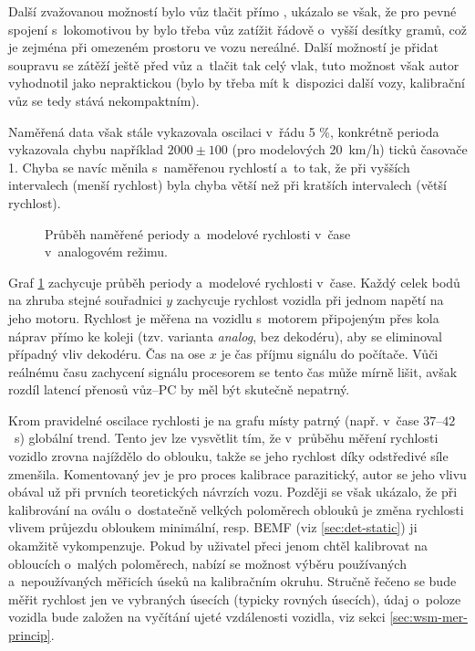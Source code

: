 Další zvažovanou možností bylo vůz tlačit přímo ,
ukázalo se však, že pro pevné spojení s~lokomotivou by bylo třeba vůz zatížit
řádově o~vyšší desítky gramů, což je zejména při omezeném prostoru ve vozu
nereálné. Další možností je přidat soupravu se zátěží ještě před vůz a~tlačit
tak celý vlak, tuto možnost však autor vyhodnotil jako nepraktickou (bylo by
třeba mít k~dispozici další vozy, kalibrační vůz se tedy stává nekompaktním).

Naměřená data však stále vykazovala oscilaci v~řádu 5 \%, konkrétně perioda
vykazovala chybu například $2000 \pm 100$ (pro modelových 20~km/h) ticků
časovače 1. Chyba se navíc měnila s~naměřenou rychlostí a~to tak, že při
vyšších intervalech (menší rychlost) byla chyba větší než při kratších
intervalech (větší rychlost).

\begin{figure}[ht]

\caption{Průběh naměřené periody a~modelové rychlosti v~čase v~analogovém
režimu.}
\label{fig:speed-analog}
\end{figure}

Graf \ref{fig:speed-analog} zachycuje průběh periody a~modelové rychlosti
v~čase. Každý celek bodů na zhruba stejné souřadnici $y$ zachycuje rychlost
vozidla při jednom napětí na jeho motoru. Rychlost je měřena na vozidlu
s~motorem připojeným přes kola náprav přímo ke koleji (tzv. varianta
\textit{analog}, bez dekodéru), aby se eliminoval případný vliv dekodéru. Čas
na ose $x$ je čas příjmu signálu do počítače. Vůči reálnému času zachycení
signálu procesorem se tento čas může mírně lišit, avšak rozdíl latencí
přenosů vůz--PC by měl být skutečně nepatrný.

Krom pravidelné oscilace rychlosti je na grafu místy patrný (např. v~čase
$37$--$42$~s) globální  trend. Tento jev lze vysvětlit tím, že
v~průběhu měření rychlosti vozidlo zrovna najíždělo do oblouku, takže se jeho
rychlost díky odstředivé síle zmenšila. Komentovaný jev je pro proces kalibrace
parazitický, autor se jeho vlivu obával už při prvních teoretických návrzích
vozu. Později se však ukázalo, že při kalibrování na oválu o~dostatečně velkých
poloměrech oblouků je změna rychlosti vlivem průjezdu obloukem minimální, resp.
\gls{BEMF} (viz \ref{sec:det-static}) ji okamžitě vykompenzuje. Pokud by uživatel
přeci jenom chtěl kalibrovat na obloucích o~malých poloměrech, nabízí se
možnost výběru používaných a~nepoužívaných měřicích úseků na kalibračním
okruhu. Stručně řečeno se bude měřit rychlost jen ve vybraných úsecích (typicky
rovných úsecích), údaj o~poloze vozidla bude založen na vyčítání ujeté
vzdálenosti vozidla, viz sekci \ref{sec:wsm-mer-princip}.

